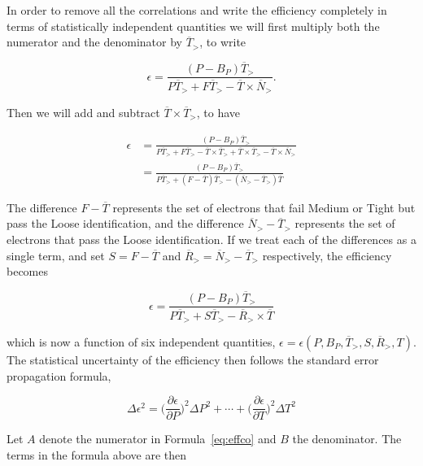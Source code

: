 In order to remove all the correlations and write the efficiency completely in
terms of statistically independent quantities we will first multiply both the
numerator and the denominator by $\overline{T}_>$, to write

$$
	\epsilon = \frac{(P-B_P)\overline{T}_>}{P\overline{T}_> + F\overline{T}_> - \overline{T}\times \overline{N}_>}.
$$

Then we will add and subtract $\overline{T} \times \overline{T}_>$, to have


\begin{equation*}
	\begin{split}
		\epsilon & = \frac{(P-B_P)\overline{T}_>}{P\overline{T}_> + F\overline{T}_> - \overline{T}\times \overline{T}_>
			+ \overline{T}\times \overline{T}_> - \overline{T}\times \overline{N}_>}  \\
		&  =  \frac{(P-B_P)\overline{T}_>}{P\overline{T}_> + (F - \overline{T})\overline{T}_>
			- (\overline{N}_> - \overline{T}_>)\overline{T}}
	\end{split}
\end{equation*}

The difference $F - \overline{T}$ represents the set of electrons that fail
Medium or Tight but pass the Loose identification, and the difference
$\overline{N}_> - \overline{T}_>$ represents the set of electrons that pass the
Loose identification. If we treat each of the differences as a single term, and
set $S = F - \overline{T}$ and $\overline{R}_> = \overline{N}_> -
	\overline{T}_>$ respectively, the efficiency becomes

\begin{equation}\label{eq:effco}
	\epsilon = \frac{(P-B_P)\overline{T}_>}{P\overline{T}_> + S\overline{T}_>
		- \overline{R}_>\times \overline{T}}
\end{equation}

which is now a function of six independent quantities, $\epsilon=\epsilon(P,
	B_P, \overline{T}_>, S, \overline{R}_>, T)$. The statistical uncertainty of the
efficiency then follows the standard error propagation formula,

\begin{equation}\label{eq:statprop}
	\Delta \epsilon^2 = \bigg(\frac{\partial \epsilon}{\partial P}\bigg)^2\Delta P^2 + \cdots +
	\bigg(\frac{\partial \epsilon}{\partial T}\bigg)^2\Delta T^2
\end{equation}


Let $A$ denote the numerator in Formula~\ref{eq:effco} and $B$ the denominator.
The terms in the formula above are then


